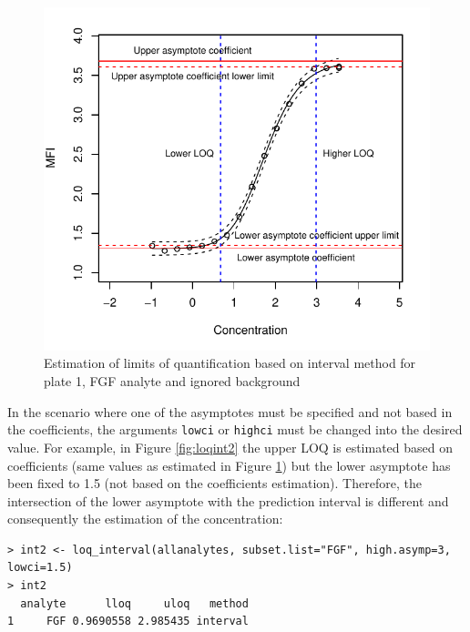 \documentclass[11pt]{article}\usepackage[]{graphicx}\usepackage[]{color}
\makeatletter
\def\maxwidth{ %
  \ifdim\Gin@nat@width>\linewidth
    \linewidth
  \else
    \Gin@nat@width
  \fi
}
\newenvironment{kframe}{%
 \def\at@end@of@kframe{}%
 \ifinner\ifhmode%
  \def\at@end@of@kframe{\end{minipage}}%
  \begin{minipage}{\columnwidth}%
 \fi\fi%
 \def\FrameCommand##1{\hskip\@totalleftmargin \hskip-\fboxsep
 \colorbox{shadecolor}{##1}\hskip-\fboxsep
     \hskip-\linewidth \hskip-\@totalleftmargin \hskip\columnwidth}%
 \MakeFramed {\advance\hsize-\width
   \@totalleftmargin\z@ \linewidth\hsize
   \@setminipage}}%
 {\par\unskip\endMakeFramed%
 \at@end@of@kframe}
\newenvironment{knitrout}{}{} %
\makeatother
\begin{document}
\begin{knitrout}
\color{fgcolor}\begin{figure}

{\centering \includegraphics[width=\maxwidth]{./loqint-1} 

}

\caption[Estimation of limits of quantification based on interval method for plate 1, FGF analyte and ignored background]{Estimation of limits of quantification based on interval method for plate 1, FGF analyte and ignored background}\label{fig:loqint}
\end{figure}


\end{knitrout}



\noindent In the scenario where one of the asymptotes must be specified 
and not based in the coefficients, the arguments {\tt lowci} or {\tt highci} 
must be changed into the desired value. For example, in Figure 
\ref{fig:loqint2} the upper LOQ is estimated based on coefficients 
(same values as estimated in Figure \ref{fig:loqint}) but the lower 
asymptote has been fixed to 1.5 (not based on the 
coefficients estimation). Therefore, the intersection of the lower asymptote 
with the prediction interval is different and consequently the 
estimation of the concentration:


\begin{knitrout}
\color{fgcolor}\begin{kframe}
\begin{verbatim}
> int2 <- loq_interval(allanalytes, subset.list="FGF", high.asymp=3, lowci=1.5)
> int2
  analyte      lloq     uloq   method
1     FGF 0.9690558 2.985435 interval
\end{verbatim}
\end{kframe}
\end{knitrout}
\end{document}
